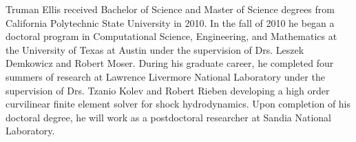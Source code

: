\documentclass[12pt]{report} %
\begin{document}



\begin{vita}
Truman Ellis received Bachelor of Science and Master of Science degrees from California Polytechnic State University in 2010. 
In the fall of 2010 he began a doctoral program in Computational Science, Engineering, and Mathematics at the University of Texas at Austin
under the supervision of Drs. Leszek Demkowicz and Robert Moser.
During his graduate career, he completed four summers of research at Lawrence Livermore National Laboratory under the supervision of
Drs. Tzanio Kolev and Robert Rieben developing a high order curvilinear finite element solver for shock hydrodynamics.
Upon completion of his doctoral degree, he will work as a postdoctoral researcher at Sandia National Laboratory.

\end{vita}
\end{document}
